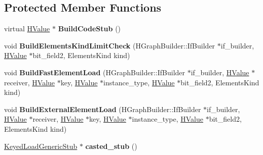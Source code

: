 \subsection*{Protected Member Functions}
\begin{DoxyCompactItemize}
\item 
\hypertarget{classv8_1_1internal_1_1_code_stub_graph_builder_3_01_keyed_load_generic_stub_01_4_aec62f80b6aa80c7c03d47ff8e81c4ea2}{}virtual \hyperlink{classv8_1_1internal_1_1_h_value}{H\+Value} $\ast$ {\bfseries Build\+Code\+Stub} ()\label{classv8_1_1internal_1_1_code_stub_graph_builder_3_01_keyed_load_generic_stub_01_4_aec62f80b6aa80c7c03d47ff8e81c4ea2}

\item 
\hypertarget{classv8_1_1internal_1_1_code_stub_graph_builder_3_01_keyed_load_generic_stub_01_4_a0a528a2dd74d7ee9b798222b658b8624}{}void {\bfseries Build\+Elements\+Kind\+Limit\+Check} (H\+Graph\+Builder\+::\+If\+Builder $\ast$if\+\_\+builder, \hyperlink{classv8_1_1internal_1_1_h_value}{H\+Value} $\ast$bit\+\_\+field2, Elements\+Kind kind)\label{classv8_1_1internal_1_1_code_stub_graph_builder_3_01_keyed_load_generic_stub_01_4_a0a528a2dd74d7ee9b798222b658b8624}

\item 
\hypertarget{classv8_1_1internal_1_1_code_stub_graph_builder_3_01_keyed_load_generic_stub_01_4_a978e3de8fcac8d5b029e50180d987026}{}void {\bfseries Build\+Fast\+Element\+Load} (H\+Graph\+Builder\+::\+If\+Builder $\ast$if\+\_\+builder, \hyperlink{classv8_1_1internal_1_1_h_value}{H\+Value} $\ast$receiver, \hyperlink{classv8_1_1internal_1_1_h_value}{H\+Value} $\ast$key, \hyperlink{classv8_1_1internal_1_1_h_value}{H\+Value} $\ast$instance\+\_\+type, \hyperlink{classv8_1_1internal_1_1_h_value}{H\+Value} $\ast$bit\+\_\+field2, Elements\+Kind kind)\label{classv8_1_1internal_1_1_code_stub_graph_builder_3_01_keyed_load_generic_stub_01_4_a978e3de8fcac8d5b029e50180d987026}

\item 
\hypertarget{classv8_1_1internal_1_1_code_stub_graph_builder_3_01_keyed_load_generic_stub_01_4_a5ec814793a3550f1dad7877421bcf7df}{}void {\bfseries Build\+External\+Element\+Load} (H\+Graph\+Builder\+::\+If\+Builder $\ast$if\+\_\+builder, \hyperlink{classv8_1_1internal_1_1_h_value}{H\+Value} $\ast$receiver, \hyperlink{classv8_1_1internal_1_1_h_value}{H\+Value} $\ast$key, \hyperlink{classv8_1_1internal_1_1_h_value}{H\+Value} $\ast$instance\+\_\+type, \hyperlink{classv8_1_1internal_1_1_h_value}{H\+Value} $\ast$bit\+\_\+field2, Elements\+Kind kind)\label{classv8_1_1internal_1_1_code_stub_graph_builder_3_01_keyed_load_generic_stub_01_4_a5ec814793a3550f1dad7877421bcf7df}

\item 
\hypertarget{classv8_1_1internal_1_1_code_stub_graph_builder_3_01_keyed_load_generic_stub_01_4_a9098de215df8d6832950d22690c88729}{}\hyperlink{classv8_1_1internal_1_1_keyed_load_generic_stub}{Keyed\+Load\+Generic\+Stub} $\ast$ {\bfseries casted\+\_\+stub} ()\label{classv8_1_1internal_1_1_code_stub_graph_builder_3_01_keyed_load_generic_stub_01_4_a9098de215df8d6832950d22690c88729}

\end{DoxyCompactItemize}
